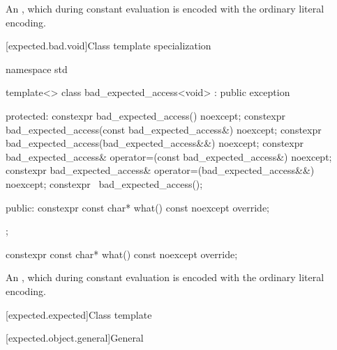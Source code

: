 \begin{itemdescr}
\pnum
\returns
An  \ntbs,
which during constant evaluation is encoded with
the ordinary literal encoding.
\end{itemdescr}

[expected.bad.void]{Class template specialization }

\begin{codeblock}
namespace std {
  template<>
  class bad_expected_access<void> : public exception {
  protected:
    constexpr bad_expected_access() noexcept;
    constexpr bad_expected_access(const bad_expected_access&) noexcept;
    constexpr bad_expected_access(bad_expected_access&&) noexcept;
    constexpr bad_expected_access& operator=(const bad_expected_access&) noexcept;
    constexpr bad_expected_access& operator=(bad_expected_access&&) noexcept;
    constexpr ~bad_expected_access();

  public:
    constexpr const char* what() const noexcept override;
  };
}
\end{codeblock}

%
\begin{itemdecl}
constexpr const char* what() const noexcept override;
\end{itemdecl}

\begin{itemdescr}
\pnum
\returns
An  \ntbs,
which during constant evaluation is encoded with
the ordinary literal encoding.
\end{itemdescr}

[expected.expected]{Class template }

[expected.object.general]{General}

